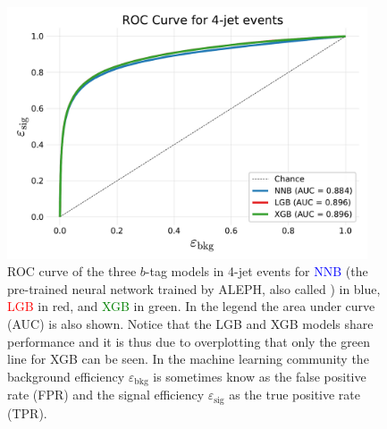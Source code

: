 \begin{figure}
  \includegraphics[width=0.95\textwidth, trim=10 10 10 40, clip]{figures/quarks/ROC_4_jet-down_sample=1.00-ML_vars=vertex-selection=b-ejet_min=4-n_iter_RS_lgb=99-n_iter_RS_xgb=9-cdot_cut=0.90-version=19.pdf}
  \caption[ROC curve for 4-jet $b$-tagging]
          {ROC curve of the three $b$-tag models in 4-jet events for \textcolor{blue}{NNB} (the pre-trained neural network trained by ALEPH, also called ) in blue, \textcolor{red}{LGB} in red, and \textcolor{green}{XGB} in green. In the legend the area under curve (AUC) is also shown. Notice that the LGB and XGB models share performance and it is thus due to overplotting that only the green line for XGB can be seen. In the machine learning community the background efficiency $\varepsilon_\mathrm{bkg}$ is sometimes know as the false positive rate (FPR) and the signal efficiency $\varepsilon_\mathrm{sig}$ as the true positive rate (TPR).  
          } 
  \label{fig:q:roc_btag_4j}
\end{figure}






\newpage


